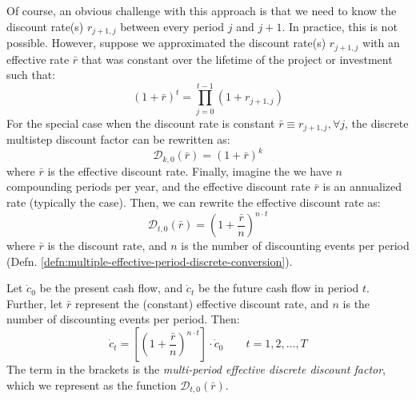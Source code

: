\documentclass[11pt]{article}
\theoremstyle{definition}
\begin{document}
Of course, an obvious challenge with this approach is that we need to know the discount rate(s) $r_{j+1,j}$ between every period $j$ and $j+1$.
In practice, this is not possible. However, suppose we  approximated the discount rate(s) $r_{j+1,j}$ with an effective rate $\bar{r}$ 
that was constant over the lifetime of the project or investment such that:
\begin{equation}\label{eq:effective-rate}
\left(1+\bar{r}\right)^{t} = \prod_{j=0}^{t-1}\left(1+r_{j+1,j}\right)
\end{equation}
For the special case when the discount rate is constant $\bar{r}\equiv{r_{j+1,j}},\forall{j}$, the discrete multistep discount factor
can be rewritten as:
\begin{equation}\label{eq:multi-period-discrete-discount-factor}
\mathcal{D}_{k,0}(\bar{r}) = \left(1+\bar{r}\right)^k
\end{equation}
where $\bar{r}$ is the effective discount rate. Finally, imagine the we have $n$ compounding periods per year, 
and the effective discount rate $\bar{r}$ is an annualized rate (typically the case). 
Then, we can rewrite the effective discount rate as:
\begin{equation}\label{eq:effective-rate-compounded}
\mathcal{D}_{t,0}(\bar{r}) = \left(1+\frac{\bar{r}}{n}\right)^{n\cdot{t}}
\end{equation}
where $\bar{r}$ is the discount rate, and $n$ is the number of discounting events per period
(Defn. \ref{defn:multiple-effective-period-discrete-conversion}).
\begin{definition}\label{defn:multiple-effective-period-discrete-conversion}
	Let $\dot{c}_0$ be the present cash flow, and $\dot{c}_t$ be the future cash flow in period $t$. 
	Further, let $\bar{r}$ represent the (constant) effective discount rate, and $n$ is the number of discounting events per period. 
	Then:
	\begin{equation}
	\dot{c}_{t} = \left[\left(1+\frac{\bar{r}}{n}\right)^{n\cdot{t}}\right]\cdot\dot{c}_{0}\qquad{t=1,2,\dots,T}
	\end{equation}
	The term in the brackets is the \textit{multi-period effective discrete discount factor}, which we represent as the function $\mathcal{D}_{t,0}(\bar{r})$.
\end{definition}
\end{document}
